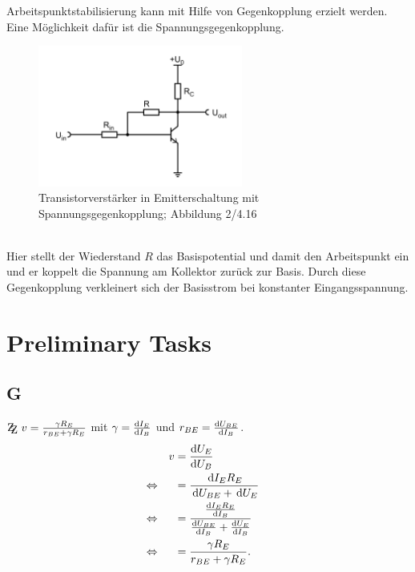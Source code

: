 \documentclass[a4paper,10pt]{article}
\newcommand{\td}{\,\text{d}}
\newcommand{\zz}{\mathrm{Z\kern-.3em\raise-0.5ex\hbox{Z} }}
\numberwithin{equation}{section}
\begin{document}
\begin{multicols}{2}
	\\\\Arbeitspunktstabilisierung kann mit Hilfe von Gegenkopplung erzielt werden.
	Eine Möglichkeit dafür ist die Spannungsgegenkopplung.
	\begin{figure}[h]
		\centering
		\includegraphics[width=0.6\textwidth]{spannungsgegenkopplung.png}
		\caption{Transistorverstärker in Emitterschaltung mit Spannungsgegenkopplung; Abbildung 2/4.16 \cite{Praktikumsanleitung}}
		\vspace{100cm}
	\end{figure}\\
	Hier stellt der Wiederstand $R$ das Basispotential und damit den Arbeitspunkt ein und er koppelt die Spannung am Kollektor zurück zur Basis.
	Durch diese Gegenkopplung verkleinert sich der Basisstrom bei konstanter Eingangsspannung.

	\newpage
	\section{Preliminary Tasks}
	\subsection{G}
	$\zz\ v=\tfrac{\gamma R_E}{r_{BE}+\gamma R_E}$ mit $\gamma =\diff[]{I_E}{I_B}$ und $r_{BE}=\diff[]{U_{BE}}{I_B}$.
	\begin{align}
		                &  & v & = \diff[]{U_E}{U_B}                                                    &  &           \\
		\Leftrightarrow &  &   & = \dfrac{\td I_ER_E}{\td U_{BE}+\td U_E}                               &  & \nonumber \\
		\Leftrightarrow &  &   & = \dfrac{\diff[]{I_ER_E}{I_B}}{\diff[]{U_{BE}}{I_B}+\diff[]{U_E}{I_B}} &  & \nonumber \\
		\Leftrightarrow &  &   & = \dfrac{\gamma R_E}{r_{BE}+\gamma R_E}.                               &  &
	\end{align}


\end{multicols}
\end{document}
